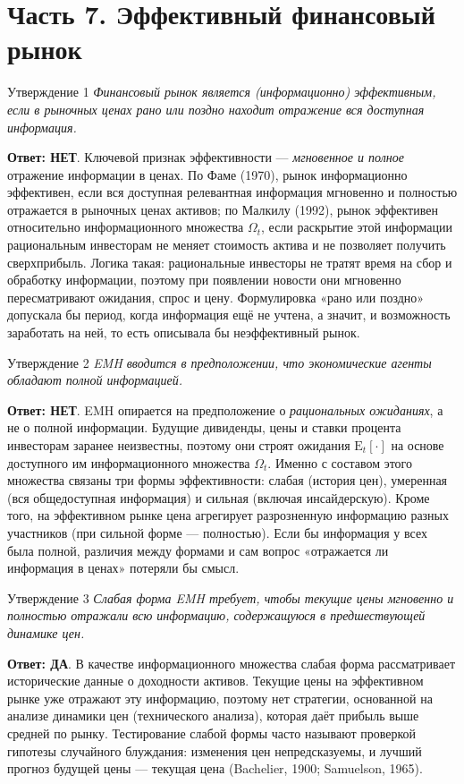 \documentclass[10pt,a4paper]{article}
\newcommand{\qda}{\textbf{\color{yesgreen}Ответ: ДА}}
\newcommand{\qnet}{\textbf{\color{nored}Ответ: НЕТ}}
\newenvironment{answer}[2]{%
  \begin{qbox}{Утверждение #1}
  \textit{#2}\par\smallskip
}{%
  \end{qbox}\vspace{2pt}
}
\begin{document}
\newpage
\section{Часть 7. Эффективный финансовый рынок}

\begin{answer}{1}{Финансовый рынок является (информационно) эффективным, если в рыночных ценах рано или поздно находит отражение вся доступная информация.}
\qnet. Ключевой признак эффективности --- \emph{мгновенное и полное} отражение информации в ценах. По Фаме (1970), рынок информационно эффективен, если вся доступная релевантная информация мгновенно и полностью отражается в рыночных ценах активов; по Малкилу (1992), рынок эффективен относительно информационного множества $\Omega_t$, если раскрытие этой информации рациональным инвесторам не меняет стоимость актива и не позволяет получить сверхприбыль. Логика такая: рациональные инвесторы не тратят время на сбор и обработку информации, поэтому при появлении новости они мгновенно пересматривают ожидания, спрос и цену. Формулировка «рано или поздно» допускала бы период, когда информация ещё не учтена, а значит, и возможность заработать на ней, то есть описывала бы неэффективный рынок.
\end{answer}

\begin{answer}{2}{EMH вводится в предположении, что экономические агенты обладают полной информацией.}
\qnet. EMH опирается на предположение о \emph{рациональных ожиданиях}, а не о полной информации. Будущие дивиденды, цены и ставки процента инвесторам заранее неизвестны, поэтому они строят ожидания $\mathrm{E}_t[\cdot]$ на основе доступного им информационного множества $\Omega_t$. Именно с составом этого множества связаны три формы эффективности: слабая (история цен), умеренная (вся общедоступная информация) и сильная (включая инсайдерскую). Кроме того, на эффективном рынке цена агрегирует разрозненную информацию разных участников (при сильной форме --- полностью). Если бы информация у всех была полной, различия между формами и сам вопрос «отражается ли информация в ценах» потеряли бы смысл.
\end{answer}

\begin{answer}{3}{Слабая форма EMH требует, чтобы текущие цены мгновенно и полностью отражали всю информацию, содержащуюся в предшествующей динамике цен.}
\qda. В качестве информационного множества слабая форма рассматривает исторические данные о доходности активов. Текущие цены на эффективном рынке уже отражают эту информацию, поэтому нет стратегии, основанной на анализе динамики цен (технического анализа), которая даёт прибыль выше средней по рынку. Тестирование слабой формы часто называют проверкой гипотезы случайного блуждания: изменения цен непредсказуемы, и лучший прогноз будущей цены --- текущая цена (Bachelier, 1900; Samuelson, 1965).
\end{answer}
\end{document}
